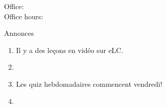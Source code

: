 \documentclass{beamer}
\subtitle[Impératifs, il y a, c'est, ce sont]{Impératifs, \lexi{il y a}, \lexi{c'est} et \lexi{ce sont}}
\begin{document}
  \begin{frame}
    \titlepage
    \tiny{Office: \\
          Office hours: }
  \end{frame}

  \begin{frame}{Annonces }
    \begin{enumerate}
      \item Il y a des leçons en vidéo sur eLC.
      \item[] 
      \item Les quiz hebdomadaires commencent vendredi!
      \item[] 
    \end{enumerate}
  \end{frame}

\end{document}
